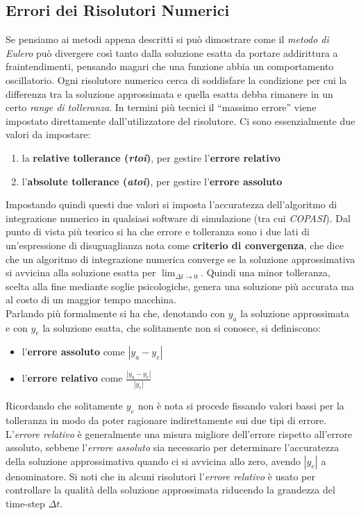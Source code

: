 \documentclass[a4paper,12pt, oneside]{book}
\begin{document}
\subsection{Errori dei Risolutori Numerici}
Se pensiamo ai metodi appena descritti si può dimostrare come il \textit{metodo
  di Eulero} può divergere così tanto dalla soluzione esatta da portare
addirittura a fraintendimenti, pensando magari che una funzione abbia un
comportamento oscillatorio. 
Ogni risolutore numerico cerca di soddisfare la condizione per cui la differenza
tra la soluzione approssimata e quella esatta debba rimanere in un certo
\textit{range di tolleranza}. In termini più tecnici il ``massimo errore'' viene
impostato direttamente dall'utilizzatore del risolutore. Ci sono essenzialmente
due valori da impostare:
\begin{enumerate}
  \item la \textbf{relative tollerance (\textit{rtoi})}, per gestire
  l'\textbf{errore relativo}
   \item l'\textbf{absolute tollerance (\textit{atoi})}, per gestire
  l'\textbf{errore assoluto} 
\end{enumerate}
Impostando quindi questi due valori si imposta l'accuratezza dell'algoritmo di
integrazione numerico in qualsiasi software di simulazione (tra cui
\textit{COPASI}). Dal punto di vista 
più teorico si ha che errore e tolleranza sono i due lati di un'espressione di
disuguaglianza nota come \textbf{criterio di convergenza}, che dice che un
algoritmo di integrazione numerica converge se la soluzione approssimativa si
avvicina alla soluzione esatta per $\lim_{\Delta t\to 0}$. Quindi una minor
tolleranza, scelta alla fine mediante soglie psicologiche, genera una soluzione
più accurata ma al costo di un maggior tempo macchina.\\
Parlando più formalmente si ha che, denotando con $y_a$ la soluzione
approssimata e con $y_e$ la soluzione esatta, che solitamente non si conosce,
si definiscono:
\begin{itemize}
  \item l'\textbf{errore assoluto} come $|y_a-y_e|$
  \item l'\textbf{errore relativo} come $\frac{|y_a-y_e|}{|y_e|}$
\end{itemize}
Ricordando che solitamente $y_e$ non è nota si procede fissando valori bassi per
la tolleranza in modo da poter ragionare indirettamente sui due tipi di errore.
L'\textit{errore relativo} è generalmente una misura migliore dell'errore
rispetto all'errore assoluto, sebbene l'\textit{errore assoluto} sia necessario
per determinare l'accuratezza della soluzione approssimativa quando ci si
avvicina allo zero, avendo $|y_e|$ a denominatore. Si noti che in alcuni
risolutori l'\textit{errore relativo} è usato per controllare la qualità della
soluzione approssimata riducendo la grandezza del time-step $\Delta t$.
\end{document}
